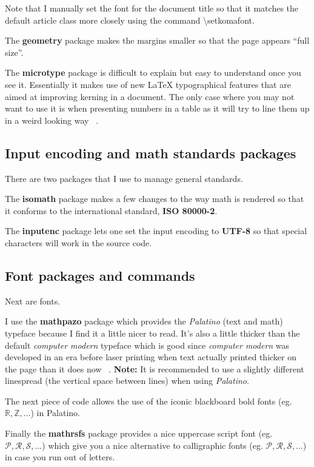       Note that I manually set the font for the document title so that it matches the default article class more closely using the command \textbackslash setkomafont.

      The \textbf{geometry} package makes the margins smaller so that the page appears ``full size''.

      The \textbf{microtype} package is difficult to explain but easy to understand once you see it. Essentially it makes use of new \LaTeX{} typographical features that are aimed at improving kerning in a document. The only case where you may not want to use it is when presenting numbers in a table as it will try to line them up in a weird looking way ~\cite{Khirevich}.

    \subsection{Input encoding and math standards packages}
      There are two packages that I use to manage general standards.

      The \textbf{isomath} package makes a few changes to the way math is rendered so that it conforms to the international standard, \textbf{ISO 80000-2}.

      The \textbf{inputenc} package lets one set the input encoding to \textbf{UTF-8} so that special characters will work in the source code.

    \subsection{Font packages and commands}
      Next are fonts.

      I use the \textbf{mathpazo} package which provides the \textit{Palatino} (text and math) typeface because I find it a little nicer to read. It's also a little thicker than the default \textit{computer modern} typeface which is good since \textit{computer modern} was developed in an era before laser printing when text actually printed thicker on the page than it does now ~\cite{fatmodern}. \textbf{Note:} It is recommended to use a slightly different linespread (the vertical space between lines) when using \textit{Palatino}.

      The next piece of code allows the use of the iconic blackboard bold fonts (eg. $\mathbb{R},\mathbb{Z},\ldots$) in Palatino.

      Finally the \textbf{mathrsfs} package provides a nice uppercase script font (eg. $\mathscr{P},\mathscr{R},\mathscr{S},\ldots$) which give you a nice alternative to calligraphic fonts (eg. $\mathcal{P},\mathcal{R},\mathcal{S},\ldots$) in case you run out of letters.
    
